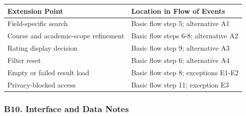 \documentclass[12pt]{article}
\renewcommand{\baselinestretch}{1.5}
\begin{document}
\begingroup
\small
\renewcommand{\baselinestretch}{1.0}\selectfont
\renewcommand{\arraystretch}{1.15}
\setlength{\tabcolsep}{6pt}
\begin{longtable}{|>{\raggedright\arraybackslash}p{}|>{\raggedright\arraybackslash}p{}|}
\hline
\textbf{Extension Point} & \textbf{Location in Flow of Events} \\ \hline
\endhead
Field-specific search & Basic flow step 5; alternative A1 \\ \hline
Course and academic-scope refinement & Basic flow steps 6-8; alternative A2 \\ \hline
Rating display decision & Basic flow step 9; alternative A3 \\ \hline
Filter reset & Basic flow step 6; alternative A4 \\ \hline
Empty or failed result load & Basic flow step 8; exceptions E1-E2 \\ \hline
Privacy-blocked access & Basic flow step 11; exception E3 \\ \hline
\end{longtable}
\endgroup
\par\medskip

\hypertarget{sec:b10-interface-and-data-notes}{}
\subsubsection*{B10. Interface and Data Notes}
\par\medskip
\end{document}
